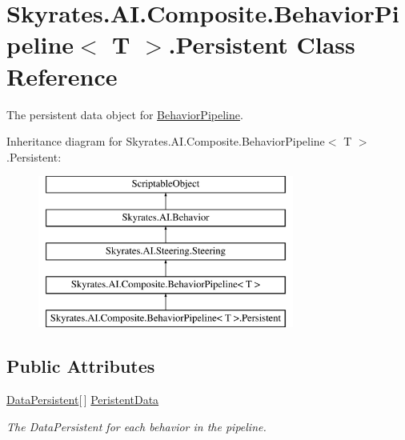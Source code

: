 \hypertarget{class_skyrates_1_1_a_i_1_1_composite_1_1_behavior_pipeline_3_01_t_01_4_1_1_persistent}{\section{Skyrates.\-A\-I.\-Composite.\-Behavior\-Pipeline$<$ T $>$.Persistent Class Reference}
\label{class_skyrates_1_1_a_i_1_1_composite_1_1_behavior_pipeline_3_01_t_01_4_1_1_persistent}
}


The persistent data object for \hyperlink{class_skyrates_1_1_a_i_1_1_composite_1_1_behavior_pipeline}{Behavior\-Pipeline}.  


Inheritance diagram for Skyrates.\-A\-I.\-Composite.\-Behavior\-Pipeline$<$ T $>$.Persistent\-:\begin{figure}[H]
\begin{center}
\leavevmode
\includegraphics[height=5.000000cm]{class_skyrates_1_1_a_i_1_1_composite_1_1_behavior_pipeline_3_01_t_01_4_1_1_persistent}
\end{center}
\end{figure}
\subsection*{Public Attributes}
\begin{DoxyCompactItemize}
\item 
\hyperlink{class_skyrates_1_1_a_i_1_1_behavior_1_1_data_persistent}{Data\-Persistent}\mbox{[}$\,$\mbox{]} \hyperlink{class_skyrates_1_1_a_i_1_1_composite_1_1_behavior_pipeline_3_01_t_01_4_1_1_persistent_a56f5186e7178555b60d70f4592a43682}{Peristent\-Data}
\begin{DoxyCompactList}\small\item\em The Data\-Persistent for each behavior in the pipeline. \end{DoxyCompactList}\end{DoxyCompactItemize}
